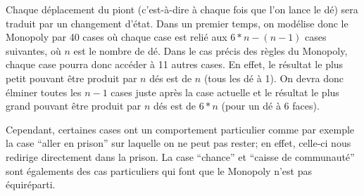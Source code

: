 \documentclass[letterpaper]{article}
\newcommand{\colornode}[1][]{\node[state,
	    align=center,
	    text=gray!40!black,
	    draw=gray,
	    fill=gray!20!white,{#1}]}
\newcommand{\drawedge}{\draw[every loop, line width=0.4mm, fill=gray, draw=gray]}
\begin{document}
    Chaque déplacement du piont (c'est-à-dire à chaque fois que l'on lance le dé) sera 
    traduit par un changement d'état.
    Dans un premier temps, on modélise donc le Monopoly par 40 cases où chaque case est
    relié aux $6*n-(n-1)$ cases suivantes, où $n$ est le nombre de dé.  Dans le cas précis
    des règles du Monopoly, chaque case pourra donc accéder à 11 autres cases.  En effet,
    le résultat le plus petit pouvant être produit par $n$ dés est de $n$ (tous les dé à 1).
    On devra donc élminer toutes les $n-1$ cases juste après la case actuelle et le résultat
    le plus grand pouvant être produit par $n$ dés est de $6*n$ (pour un dé à 6 faces).
    \begin{center}
    \end{center}
    Cependant, certaines cases ont un comportement particulier comme
    par exemple la case ``aller en prison'' sur laquelle on ne peut pas rester; en effet,
    celle-ci nous redirige directement dans la prison.  La case ``chance'' et ``caisse de
    communauté'' sont égalements des cas particuliers qui font que le Monopoly n'est pas 
    équiréparti.
    
\end{document}
